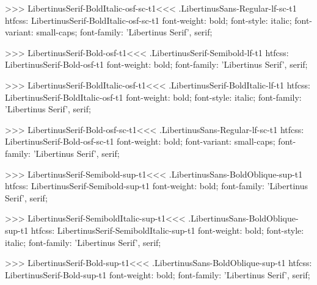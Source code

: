{{{{>>>
\<LibertinusSerif-BoldItalic-osf-sc-t1\><<<
.LibertinusSans-Regular-lf-sc-t1
htfcss:  LibertinusSerif-BoldItalic-osf-sc-t1  font-weight: bold; font-style: italic; font-variant: small-caps; font-family: 'Libertinus Serif', serif;

>>>
\<LibertinusSerif-Bold-osf-t1\><<<
.LibertinusSerif-Semibold-lf-t1
htfcss:  LibertinusSerif-Bold-osf-t1  font-weight: bold; font-family: 'Libertinus Serif', serif;

>>>
\<LibertinusSerif-BoldItalic-osf-t1\><<<
.LibertinusSerif-BoldItalic-lf-t1
htfcss:  LibertinusSerif-BoldItalic-osf-t1  font-weight: bold; font-style: italic; font-family: 'Libertinus Serif', serif;

>>>
\<LibertinusSerif-Bold-osf-sc-t1\><<<
.LibertinusSans-Regular-lf-sc-t1
htfcss:  LibertinusSerif-Bold-osf-sc-t1  font-weight: bold; font-variant: small-caps; font-family: 'Libertinus Serif', serif;

>>>
\<LibertinusSerif-Semibold-sup-t1\><<<
.LibertinusSans-BoldOblique-sup-t1
htfcss:  LibertinusSerif-Semibold-sup-t1  font-weight: bold; font-family: 'Libertinus Serif', serif;

>>>
\<LibertinusSerif-SemiboldItalic-sup-t1\><<<
.LibertinusSans-BoldOblique-sup-t1
htfcss:  LibertinusSerif-SemiboldItalic-sup-t1  font-weight: bold; font-style: italic; font-family: 'Libertinus Serif', serif;

>>>
\<LibertinusSerif-Bold-sup-t1\><<<
.LibertinusSans-BoldOblique-sup-t1
htfcss:  LibertinusSerif-Bold-sup-t1  font-weight: bold; font-family: 'Libertinus Serif', serif;

}}}}
